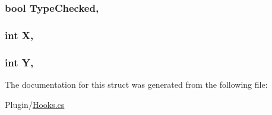 \subsubsection[{Type\+Checked}]{\setlength{\rightskip}{0pt plus 5cm}bool Type\+Checked\hspace{0.3cm}{\ttfamily [get]}, {\ttfamily [set]}}\label{structOTA_1_1Plugin_1_1HookArgs_1_1PlayerWorldAlteration_a2817266702c8d326204bfe1e294199f3}
\hypertarget{structOTA_1_1Plugin_1_1HookArgs_1_1PlayerWorldAlteration_a80c0944640e62d3ed6c5419c1bcc0c88}{}
\subsubsection[{X}]{\setlength{\rightskip}{0pt plus 5cm}int X\hspace{0.3cm}{\ttfamily [get]}, {\ttfamily [set]}}\label{structOTA_1_1Plugin_1_1HookArgs_1_1PlayerWorldAlteration_a80c0944640e62d3ed6c5419c1bcc0c88}
\hypertarget{structOTA_1_1Plugin_1_1HookArgs_1_1PlayerWorldAlteration_aa482c4cc86a24474e4fb19b5b5978778}{}
\subsubsection[{Y}]{\setlength{\rightskip}{0pt plus 5cm}int Y\hspace{0.3cm}{\ttfamily [get]}, {\ttfamily [set]}}\label{structOTA_1_1Plugin_1_1HookArgs_1_1PlayerWorldAlteration_aa482c4cc86a24474e4fb19b5b5978778}


The documentation for this struct was generated from the following file\+:\begin{DoxyCompactItemize}
\item 
Plugin/\hyperlink{Hooks_8cs}{Hooks.\+cs}\end{DoxyCompactItemize}

